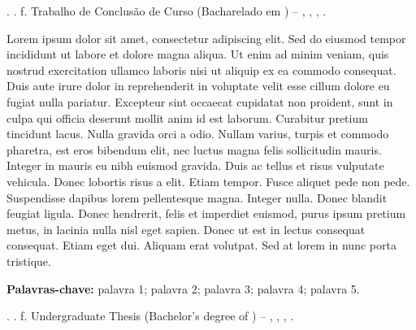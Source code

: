 \newpage
{}

\begingroup
{}
\setlength{\parindent}{0pt}

\authorsCitation{} \textbf{\workTitle}\ifdefempty{\workSubtitle}{}{: \workSubtitle}. \workYear. \pageref{LastPage} f. Trabalho de Conclusão de Curso (Bacharelado em \courseName) -- \centerName, \universityName, \workCity, \workYear.\par
\vspace{\baselineskip}

Lorem ipsum dolor sit amet, consectetur adipiscing elit. Sed do eiusmod tempor incididunt ut labore et dolore magna aliqua. Ut enim ad minim veniam, quis nostrud exercitation ullamco laboris nisi ut aliquip ex ea commodo consequat. Duis aute irure dolor in reprehenderit in voluptate velit esse cillum dolore eu fugiat nulla pariatur. Excepteur sint occaecat cupidatat non proident, sunt in culpa qui officia deserunt mollit anim id est laborum. Curabitur pretium tincidunt lacus. Nulla gravida orci a odio. Nullam varius, turpis et commodo pharetra, est eros bibendum elit, nec luctus magna felis sollicitudin mauris. Integer in mauris eu nibh euismod gravida. Duis ac tellus et risus vulputate vehicula. Donec lobortis risus a elit. Etiam tempor. Fusce aliquet pede non pede. Suspendisse dapibus lorem pellentesque magna. Integer nulla. Donec blandit feugiat ligula. Donec hendrerit, felis et imperdiet euismod, purus ipsum pretium metus, in lacinia nulla nisl eget sapien. Donec ut est in lectus consequat consequat. Etiam eget dui. Aliquam erat volutpat. Sed at lorem in nunc porta tristique.\par
\vspace{\baselineskip}

\textbf{Palavras-chave:} palavra 1; palavra 2; palavra 3; palavra 4; palavra 5.
\endgroup

\newpage
{}

\begingroup
{}
\setlength{\parindent}{0pt}

\authorsCitation{} \textbf{\workTitleEnglish}\ifdefempty{\workSubtitleEnglish}{}{: \workSubtitleEnglish}. \workYear. \pageref{LastPage} f. Undergraduate Thesis (Bachelor's degree of \courseNameEnglish) -- \centerNameEnglish, \universityNameEnglish, \workCity, \workYear.\par
\vspace{\baselineskip}

